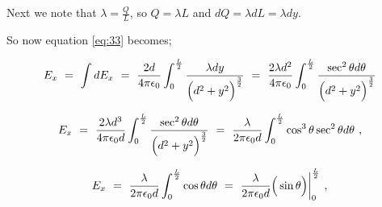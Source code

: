\documentclass{article}
\begin{document}
Next we note that \begin{math} \lambda = \frac{Q}{L} \end{math}, so \begin{math} Q = \lambda L \end{math} and \begin{math} dQ = \lambda dL = \lambda dy \end{math}. 

So now equation \ref{eq:33} becomes;

\begin{equation} \label{eq:34}
E_x \hspace{0.125cm} = \hspace{0.125cm} \int dE_{x} \hspace{0.125cm} = \hspace{0.125cm} \frac{2d}{4\pi \epsilon_{0}} \int_{0}^{\frac{L}{2}} \frac{\lambda dy}{ \Big( d^2 + y^2 \Big)^{\frac{3}{2}}}  \hspace{0.125cm} = \hspace{0.125cm} \frac{2\lambda d^{2}}{4\pi \epsilon_{0}} \int_{0}^{\frac{L}{2}} \frac{\sec^{2}{\theta}d\theta{}}{ \Big( d^2 + y^2 \Big)^{\frac{3}{2}}}
\end{equation}

\begin{equation} \label{eq:35}
E_x \hspace{0.125cm} = \hspace{0.125cm} \frac{2\lambda d^{3}}{4\pi \epsilon_{0} d} \int_{0}^{\frac{L}{2}} \frac{\sec^{2}{\theta}d\theta{}}{ \Big( d^2 + y^2 \Big)^{\frac{3}{2}}}
\hspace{0.125cm} = \hspace{0.125cm} \frac{\lambda}{2\pi \epsilon_{0} d} \int_{0}^{\frac{L}{2}} \cos^{3}{\theta} \sec^{2}{\theta} d\theta \hspace{0.125cm} ,
\end{equation}

\begin{equation} \label{eq:36}
E_x \hspace{0.125cm} = \hspace{0.125cm} \frac{\lambda}{2\pi \epsilon_{0} d} \int_{0}^{\frac{L}{2}} \cos{\theta} d\theta \hspace{0.125cm} = \hspace{0.125cm} \frac{\lambda}{2\pi \epsilon_{0} d} \Big( \sin{\theta} \Big) \bigg|_{0}^{\frac{L}{2}} \hspace{0.125cm} ,
\end{equation}
\end{document}
